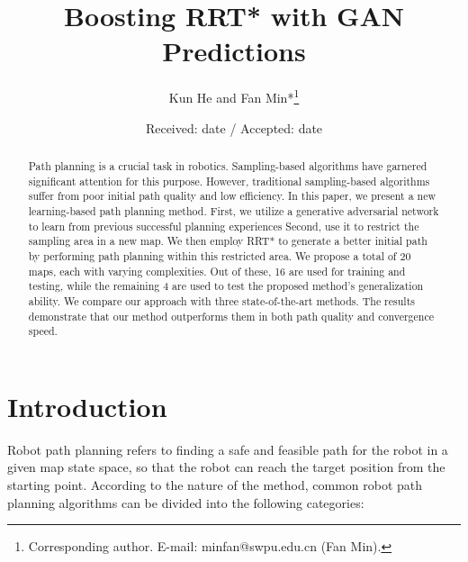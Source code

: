 \documentclass[smallcondensed]{svjour3}     %
\begin{document}
\title{Boosting RRT* with GAN Predictions}

\author{Kun He and Fan Min*\thanks{Corresponding author. E-mail: minfan@swpu.edu.cn (Fan Min).} }

\date{Received: date / Accepted: date}

\maketitle

\begin{abstract}
Path planning is a crucial task in robotics.
Sampling-based algorithms have garnered significant attention for this purpose. 
However, traditional sampling-based algorithms suffer from poor initial path quality and low efficiency. 
In this paper, we present a new learning-based path planning method. 
First, we utilize a generative adversarial network to learn from previous successful planning experiences
Second, use it to restrict the sampling area in a new map. 
We then employ RRT* to generate a better initial path by performing path planning within this restricted area. 
We propose a total of 20 maps, each with varying complexities. 
Out of these, 16 are used for training and testing, while the remaining 4 are used to test the proposed method's generalization ability. 
We compare our approach with three state-of-the-art methods.
The results demonstrate that our method outperforms them in both path quality and convergence speed.
\end{abstract}

\section{Introduction}\label{sec:introduction}
Robot path planning refers to finding a safe and feasible path for the robot in a given map state space, so that the robot can reach the target position from the starting point. 
According to the nature of the method, common robot path planning algorithms can be divided into the following categories:
\end{document}
